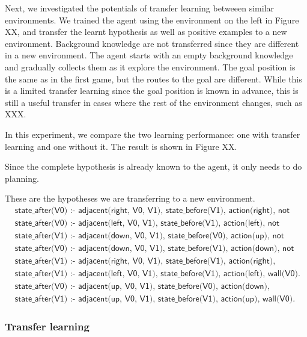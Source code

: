 Next, we investigated the potentials of transfer learning betweeen similar environments.
We trained the agent using the environment on the left in Figure XX, and transfer the learnt hypothesis as well as positive examples to a new environment.
Background knowledge are not transferred since they are different in a new environment. The agent starts with an empty background knowledge and gradually collects them
as it explore the environment. 
The goal position is the same as in the first game, but the routes to the goal are different.
While this is a limited transfer learning since the goal position is known in advance, this is still a useful transfer in cases where the rest of the environment changes,
such as XXX.

In this experiment, we compare the two learning performance: one with transfer learning and one without it. 
The result is shown in Figure XX.

Since the complete hypothesis is already known to the agent, it only needs to do planning. 

These are the hypotheses we are transferring to a new environment.
\begin{equation*}
\begin{split}
 &\textsf{state\_after(V0) :- adjacent(right, V0, V1), state\_before(V1), action(right), not wall(V0).}\\
 &\textsf{state\_after(V0) :- adjacent(left, V0, V1), state\_before(V1), action(left), not wall(V0).}\\
 &\textsf{state\_after(V1) :- adjacent(down, V0, V1), state\_before(V0), action(up), not wall(V1).}\\
 &\textsf{state\_after(V0) :- adjacent(down, V0, V1), state\_before(V1), action(down), not wall(V0).}\\
 &\textsf{state\_after(V1) :- adjacent(right, V0, V1), state\_before(V1), action(right), wall(V0).}\\
 &\textsf{state\_after(V1) :- adjacent(left, V0, V1), state\_before(V1), action(left), wall(V0).}\\
 &\textsf{state\_after(V0) :- adjacent(up, V0, V1), state\_before(V0), action(down), wall(V1).}\\
 &\textsf{state\_after(V1) :- adjacent(up, V0, V1), state\_before(V1), action(up), wall(V0).}
\end{split}
\end{equation*}

\subsubsection{Transfer learning}

